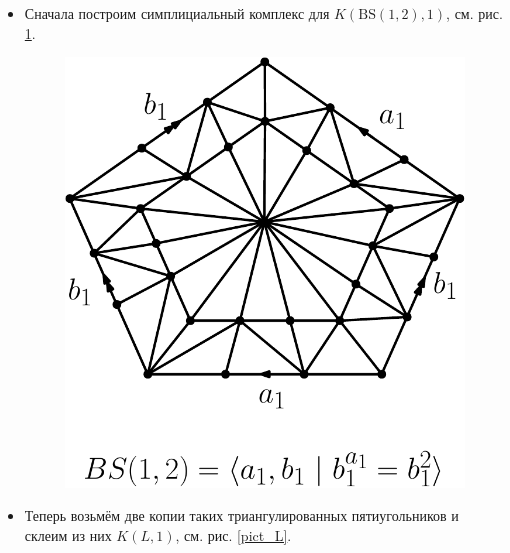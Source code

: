 \documentclass[14pt, dvipsnames, twoside]{extarticle}
\theoremstyle{definition}
\theoremstyle{remark}
\begin{document}
\begin{itemize}

\item Сначала построим симплициальный комплекс для $K(\mathrm{BS}(1, 2), 1)$, см. рис. \ref{pict_BS}.

\begin{figure}
\begin{center}
\includegraphics[scale=0.6]{BS}
\caption{}\label{pict_BS}
\end{center}
\end{figure}


\item Теперь возьмём две копии таких триангулированных пятиугольников и склеим из них $K(L, 1)$, см. рис. \ref{pict_L}.


\end{itemize}
\end{document}
